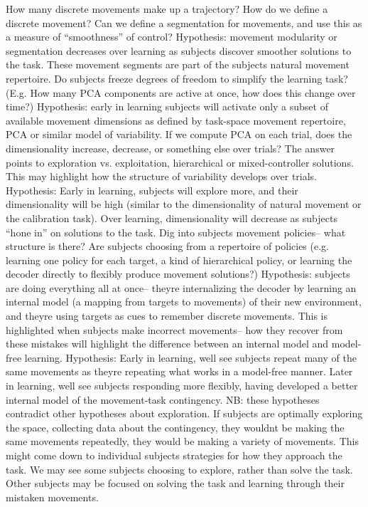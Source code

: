 \documentclass[../main.tex]{subfiles}
\begin{document}
How many discrete movements make up a trajectory? How do we define a discrete movement? Can we define a segmentation for movements, and use this as a measure of “smoothness” of control?
Hypothesis: movement modularity or segmentation decreases over learning as subjects discover smoother solutions to the task. These movement segments are part of the subjects natural movement repertoire.
Do subjects freeze degrees of freedom to simplify the learning task? (E.g. How many PCA components are active at once, how does this change over time?)
Hypothesis: early in learning subjects will activate only a subset of available movement dimensions as defined by task-space movement repertoire, PCA or similar model of variability.
If we compute PCA on each trial, does the dimensionality increase, decrease, or something else over trials? The answer points to exploration vs. exploitation, hierarchical or mixed-controller solutions. This may highlight how the structure of variability develops over trials. 
Hypothesis: Early in learning, subjects will explore more, and their dimensionality will be high (similar to the dimensionality of natural movement or the calibration task). Over learning, dimensionality will decrease as subjects “hone in” on solutions to the task. 
Dig into subjects movement policies– what structure is there? Are subjects choosing from a repertoire of policies (e.g. learning one policy for each target, a kind of hierarchical policy, or learning the decoder directly to flexibly produce movement solutions?)
Hypothesis: subjects are doing everything all at once– theyre internalizing the decoder by learning an internal model (a mapping from targets to movements) of their new environment, and theyre using targets as cues to remember discrete movements. This is highlighted when subjects make incorrect movements– how they recover from these mistakes will highlight the difference between an internal model and model-free learning.
Hypothesis: Early in learning, well see subjects repeat many of the same movements as theyre repeating what works in a model-free manner. Later in learning, well see subjects responding more flexibly, having developed a better internal model of the movement-task contingency. 
NB: these hypotheses contradict other hypotheses about exploration. If subjects are optimally exploring the space, collecting data about the contingency, they wouldnt be making the same movements repeatedly, they would be making a variety of movements. This might come down to individual subjects strategies for how they approach the task. We may see some subjects choosing to explore, rather than solve the task. Other subjects may be focused on solving the task and learning through their mistaken movements.
\end{document}
